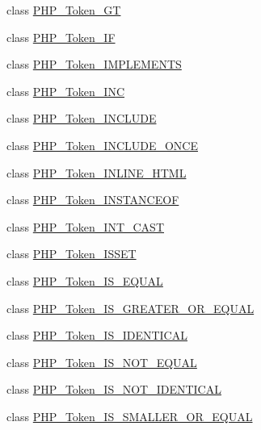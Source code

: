 \begin{DoxyCompactItemize}
\item 
class \mbox{\hyperlink{class_p_h_p___token___g_t}{P\+H\+P\+\_\+\+Token\+\_\+\+GT}}
\item 
class \mbox{\hyperlink{class_p_h_p___token___i_f}{P\+H\+P\+\_\+\+Token\+\_\+\+IF}}
\item 
class \mbox{\hyperlink{class_p_h_p___token___i_m_p_l_e_m_e_n_t_s}{P\+H\+P\+\_\+\+Token\+\_\+\+I\+M\+P\+L\+E\+M\+E\+N\+TS}}
\item 
class \mbox{\hyperlink{class_p_h_p___token___i_n_c}{P\+H\+P\+\_\+\+Token\+\_\+\+I\+NC}}
\item 
class \mbox{\hyperlink{class_p_h_p___token___i_n_c_l_u_d_e}{P\+H\+P\+\_\+\+Token\+\_\+\+I\+N\+C\+L\+U\+DE}}
\item 
class \mbox{\hyperlink{class_p_h_p___token___i_n_c_l_u_d_e___o_n_c_e}{P\+H\+P\+\_\+\+Token\+\_\+\+I\+N\+C\+L\+U\+D\+E\+\_\+\+O\+N\+CE}}
\item 
class \mbox{\hyperlink{class_p_h_p___token___i_n_l_i_n_e___h_t_m_l}{P\+H\+P\+\_\+\+Token\+\_\+\+I\+N\+L\+I\+N\+E\+\_\+\+H\+T\+ML}}
\item 
class \mbox{\hyperlink{class_p_h_p___token___i_n_s_t_a_n_c_e_o_f}{P\+H\+P\+\_\+\+Token\+\_\+\+I\+N\+S\+T\+A\+N\+C\+E\+OF}}
\item 
class \mbox{\hyperlink{class_p_h_p___token___i_n_t___c_a_s_t}{P\+H\+P\+\_\+\+Token\+\_\+\+I\+N\+T\+\_\+\+C\+A\+ST}}
\item 
class \mbox{\hyperlink{class_p_h_p___token___i_s_s_e_t}{P\+H\+P\+\_\+\+Token\+\_\+\+I\+S\+S\+ET}}
\item 
class \mbox{\hyperlink{class_p_h_p___token___i_s___e_q_u_a_l}{P\+H\+P\+\_\+\+Token\+\_\+\+I\+S\+\_\+\+E\+Q\+U\+AL}}
\item 
class \mbox{\hyperlink{class_p_h_p___token___i_s___g_r_e_a_t_e_r___o_r___e_q_u_a_l}{P\+H\+P\+\_\+\+Token\+\_\+\+I\+S\+\_\+\+G\+R\+E\+A\+T\+E\+R\+\_\+\+O\+R\+\_\+\+E\+Q\+U\+AL}}
\item 
class \mbox{\hyperlink{class_p_h_p___token___i_s___i_d_e_n_t_i_c_a_l}{P\+H\+P\+\_\+\+Token\+\_\+\+I\+S\+\_\+\+I\+D\+E\+N\+T\+I\+C\+AL}}
\item 
class \mbox{\hyperlink{class_p_h_p___token___i_s___n_o_t___e_q_u_a_l}{P\+H\+P\+\_\+\+Token\+\_\+\+I\+S\+\_\+\+N\+O\+T\+\_\+\+E\+Q\+U\+AL}}
\item 
class \mbox{\hyperlink{class_p_h_p___token___i_s___n_o_t___i_d_e_n_t_i_c_a_l}{P\+H\+P\+\_\+\+Token\+\_\+\+I\+S\+\_\+\+N\+O\+T\+\_\+\+I\+D\+E\+N\+T\+I\+C\+AL}}
\item 
class \mbox{\hyperlink{class_p_h_p___token___i_s___s_m_a_l_l_e_r___o_r___e_q_u_a_l}{P\+H\+P\+\_\+\+Token\+\_\+\+I\+S\+\_\+\+S\+M\+A\+L\+L\+E\+R\+\_\+\+O\+R\+\_\+\+E\+Q\+U\+AL}}

\end{DoxyCompactItemize}
